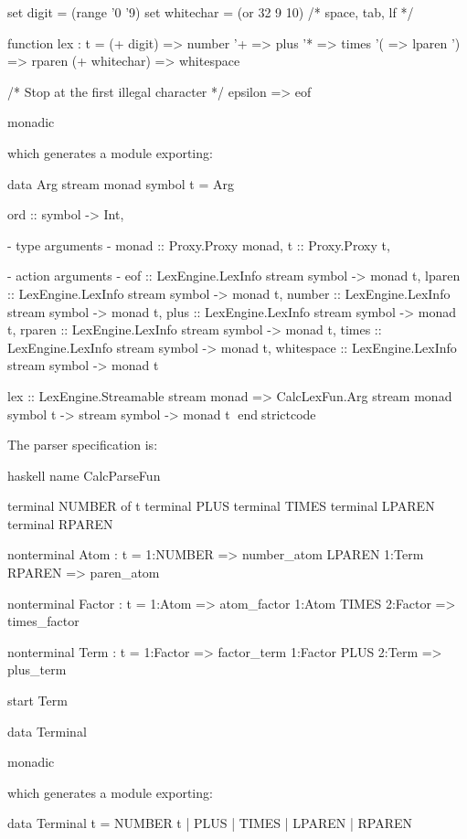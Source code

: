 \documentclass[10pt]{article}
\begin{document}
\begin{strictcode}
\begin{strictcode}
\begin{strictcode}
\begin{strictcode}
\begin{strictcode}
\begin{strictcode}
\begin{strictcode}
\begin{strictcode}
\begin{strictcode}
\begin{strictcode}
\begin{strictcode}
\begin{strictcode}
\begin{strictcode}
\begin{bigstrictcode}
\begin{strictcode}
\begin{strictcode}
\begin{bigstrictcode}
\begin{code}
set digit = (range '0 '9)
set whitechar = (or 32 9 10)  /* space, tab, lf */

function lex : t =
  (+ digit) => number
  '+ => plus
  '* => times
  '( => lparen
  ') => rparen
  (+ whitechar) => whitespace

  /* Stop at the first illegal character */
  epsilon => eof

monadic
\end{code}

\noindent
which generates a module exporting:

\begin{strictcode}
data Arg stream monad symbol t =
   Arg { ord :: symbol -> Int,

         {- type arguments -}
         monad :: Proxy.Proxy monad,
         t :: Proxy.Proxy t,

         {- action arguments -}
         eof :: LexEngine.LexInfo stream symbol -> monad t,
         lparen :: LexEngine.LexInfo stream symbol -> monad t,
         number :: LexEngine.LexInfo stream symbol -> monad t,
         plus :: LexEngine.LexInfo stream symbol -> monad t,
         rparen :: LexEngine.LexInfo stream symbol -> monad t,
         times :: LexEngine.LexInfo stream symbol -> monad t,
         whitespace :: LexEngine.LexInfo stream symbol -> monad t }

lex :: LexEngine.Streamable stream monad
       => CalcLexFun.Arg stream monad symbol t -> stream symbol -> monad t
endstrictcode

The parser specification is:

\begin{code}
haskell
name CalcParseFun

terminal NUMBER of t
terminal PLUS
terminal TIMES
terminal LPAREN
terminal RPAREN

nonterminal Atom : t =
  1:NUMBER => number_atom
  LPAREN 1:Term RPAREN => paren_atom

nonterminal Factor : t =
  1:Atom => atom_factor
  1:Atom TIMES 2:Factor => times_factor

nonterminal Term : t =
  1:Factor => factor_term
  1:Factor PLUS 2:Term => plus_term

start Term

data Terminal

monadic
\end{code}

\noindent
which generates a module exporting:

\begin{strictcode}
data Terminal t =
   NUMBER t
 | PLUS
 | TIMES
 | LPAREN
 | RPAREN


\end{strictcode}
\end{strictcode}
\end{bigstrictcode}
\end{strictcode}
\end{strictcode}
\end{bigstrictcode}
\end{strictcode}
\end{strictcode}
\end{strictcode}
\end{strictcode}
\end{strictcode}
\end{strictcode}
\end{strictcode}
\end{strictcode}
\end{strictcode}
\end{strictcode}
\end{strictcode}
\end{strictcode}
\end{strictcode}
\end{document}
